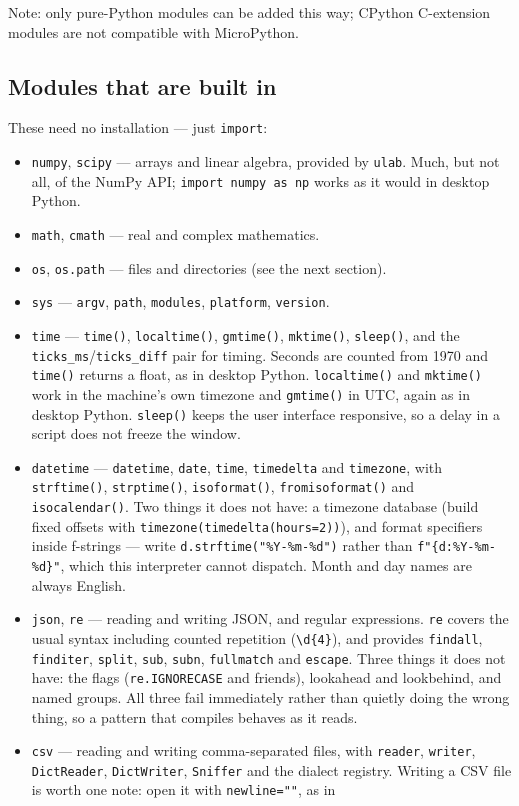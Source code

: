 Note: only pure-Python modules can be added this way; CPython C-extension
modules are not compatible with MicroPython.

\subsection*{Modules that are built in}

These need no installation --- just {\tt import}:

\begin{itemize}
\item{\tt numpy}, {\tt scipy} --- arrays and linear algebra, provided by
\verb+ulab+.  Much, but not all, of the NumPy API; \verb+import numpy as np+
works as it would in desktop Python.
\item{\tt math}, {\tt cmath} --- real and complex mathematics.
\item{\tt os}, {\tt os.path} --- files and directories (see the next
section).
\item{\tt sys} --- {\tt argv}, {\tt path}, {\tt modules}, {\tt platform},
{\tt version}.
\item{\tt time} --- {\tt time()}, {\tt localtime()}, {\tt gmtime()},
{\tt mktime()}, {\tt sleep()}, and the {\tt ticks\_ms}/{\tt ticks\_diff}
pair for timing.  Seconds are counted from 1970 and {\tt time()} returns a
float, as in desktop Python.  {\tt localtime()} and {\tt mktime()} work in
the machine's own timezone and {\tt gmtime()} in UTC, again as in desktop
Python.  {\tt sleep()} keeps the user interface responsive, so a delay in a
script does not freeze the window.
\item{\tt datetime} --- {\tt datetime}, {\tt date}, {\tt time},
{\tt timedelta} and {\tt timezone}, with {\tt strftime()},
{\tt strptime()}, {\tt isoformat()}, {\tt fromisoformat()} and
{\tt isocalendar()}.  Two things it does not have: a timezone database
(build fixed offsets with {\tt timezone(timedelta(hours=2))}), and format
specifiers inside f-strings --- write {\tt d.strftime("\%Y-\%m-\%d")}
rather than \verb+f"{d:%Y-%m-%d}"+, which this interpreter cannot dispatch.
Month and day names are always English.
\item{\tt json}, {\tt re} --- reading and writing JSON, and regular
expressions.  {\tt re} covers the usual syntax including counted repetition
({\tt \textbackslash d\{4\}}), and provides {\tt findall}, {\tt finditer},
{\tt split}, {\tt sub}, {\tt subn}, {\tt fullmatch} and {\tt escape}.  Three
things it does not have: the flags ({\tt re.IGNORECASE} and friends), lookahead
and lookbehind, and named groups.  All three fail immediately rather than
quietly doing the wrong thing, so a pattern that compiles behaves as it reads.
\item{\tt csv} --- reading and writing comma-separated files, with
{\tt reader}, {\tt writer}, {\tt DictReader}, {\tt DictWriter},
{\tt Sniffer} and the dialect registry.  Writing a CSV file is worth one
note: open it with \verb+newline=""+, as in


\end{itemize}
